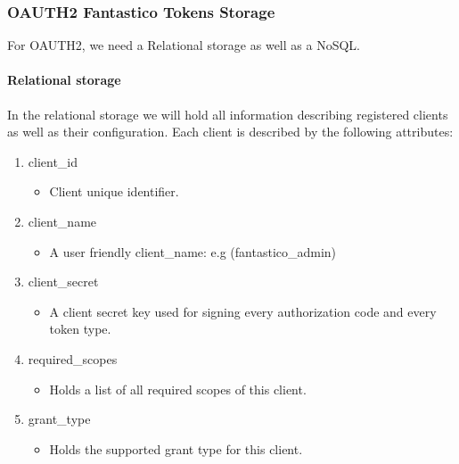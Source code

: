 \documentclass[letterpaper,10pt,english]{sphinxmanual}
\begin{document}
\subsubsection{OAUTH2 Fantastico Tokens Storage}
\label{features/oauth2/tokens_storage::doc}\label{features/oauth2/tokens_storage:oauth2-fantastico-tokens-storage}
For OAUTH2, we need a Relational storage as well as a NoSQL.


\paragraph{Relational storage}
\label{features/oauth2/tokens_storage:relational-storage}
In the relational storage we will hold all information describing registered clients as well as their configuration. Each client
is described by the following attributes:
\begin{enumerate}
\item {} 
client\_id
\begin{itemize}
\item {} 
Client unique identifier.

\end{itemize}

\item {} 
client\_name
\begin{itemize}
\item {} 
A user friendly client\_name: e.g (fantastico\_admin)

\end{itemize}

\item {} 
client\_secret
\begin{itemize}
\item {} 
A client secret key used for signing every authorization code and every token type.

\end{itemize}

\item {} 
required\_scopes
\begin{itemize}
\item {} 
Holds a list of all required scopes of this client.

\end{itemize}

\item {} 
grant\_type
\begin{itemize}
\item {} 
Holds the supported grant type for this client.


\end{itemize}
\end{enumerate}
\end{document}
